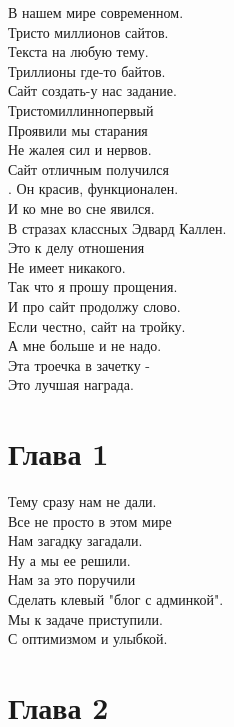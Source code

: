 \documentclass{article}
\begin{document}
    В нашем мире современном.\\
    Тристо миллионов сайтов.\\
    Текста на любую тему.\\
    Триллионы где-то байтов.\\
    Сайт создать-у нас задание.\\
    Тристомиллиннопервый\\
    Проявили мы старания\\
    Не жалея сил и нервов.\\
    Сайт отличным получился\\.
    Он красив, функционален.\\
    И ко мне во сне явился.\\
    В стразах классных Эдвард Каллен.\\
    Это к делу отношения\\ 
    Не имеет никакого.\\
    Так что я прошу прощения.\\
    И про сайт продолжу слово.\\
    Если честно, сайт на тройку.\\
    А мне больше и не надо.\\
    Эта троечка в зачетку -\\
    Это лучшая награда.\\
    
\newpage
 \section{Глава 1}

Тему сразу нам не дали.\\
Все не просто в этом мире\\
Нам загадку загадали.\\
Ну а мы ее решили.\\
Нам за это поручили\\
Сделать клевый "блог с админкой".\\
Мы к задаче приступили.\\
С оптимизмом и улыбкой.\\


\newpage
 \section{Глава 2}
\end{document}
